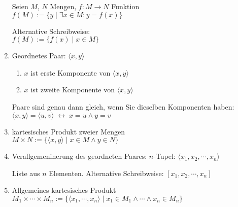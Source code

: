 \documentclass{article}
\def\pair(#1,#2){\langle #1, #2 \rangle}
\begin{document}
\begin{enumerate}
      Seien $M$, $N$ Mengen, $f:M \rightarrow N$ Funktion 
      \\[0.1cm]
      \hspace*{1.3cm}
      $f(M) := \{ y \;|\; \exists x \in M: y = f(x) \}$

      Alternative Schreibweise: 
      \\[0.1cm]
      \hspace*{1.3cm}
      $f(M) := \bigl\{ f(x) \;|\; x \in M \}$
\item Geordnetes Paar: $\pair(x,y)$ 
      \begin{enumerate}
      \item $x$ ist erste  Komponente von $\pair(x,y)$
      \item $x$ ist zweite Komponente von $\pair(x,y)$
      \end{enumerate}
      Paare sind genau dann gleich, wenn Sie dieselben Komponenten haben: 
      \\[0.1cm]
      \hspace*{1.3cm} 
      $\pair(x,y) = \pair(u,v) \;\leftrightarrow\; x = u \wedge y = v$
\item kartesisches Produkt zweier Mengen 
      \\[0.1cm]
      \hspace*{1.3cm}
      $M \times N := \bigl\{ \pair(x,y) \;|\; x \in M \wedge y \in N \}$
\item Verallgemeninerung des geordneten Paares: $n$-Tupel: \quad $\langle x_1, x_2, \cdots, x_n \rangle$

      Liste aus $n$ Elementen.  Alternative Schreibweise: $[x_1,x_2,\cdots,x_n]$
\item Allgemeines kartesisches Produkt 
      \\[0.1cm]
      \hspace*{1.3cm}
      $M_1 \times \cdots \times M_n := \bigl\{ \langle x_1, \cdots, x_n \rangle \;\big|\; x_1 \in M_1 \wedge \cdots \wedge x_n \in M_n \bigr\}$
\end{enumerate}
\end{document}

